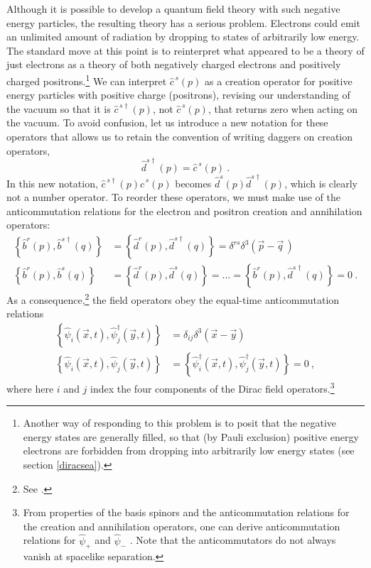 \documentclass[onecolumn,secnumarabic,amsmath,amssymb,balancelastpage,nofootinbib]{article}
\begin{document}
Although it is possible to develop a quantum field theory with such negative energy particles, the resulting theory has a serious problem.  Electrons could emit an unlimited amount of radiation by dropping to states of arbitrarily low energy.  The standard move at this point is to reinterpret what appeared to be a theory of just electrons as a theory of both negatively charged electrons and positively charged positrons.\footnote{Another way of responding to this problem is to posit that the negative energy states are generally filled, so that (by Pauli exclusion) positive energy electrons are forbidden from dropping into arbitrarily low energy states (see section \ref{diracsea}).}  We can interpret $\widehat{c}^{\,s}(p)$ as a creation operator for positive energy particles with positive charge (positrons), revising our understanding of the vacuum so that it is  $\widehat{c}^{\,s\dagger}(p)$, not $\widehat{c}^{\,s}(p)$, that returns zero when acting on the vacuum.  To avoid confusion, let us introduce a new notation for these operators that allows us to retain the convention of writing daggers on creation operators,
\begin{equation}
\widehat{d}^{s\dagger}(p)=\widehat{c}^{\,s}(p)
\ .
\label{operatorswap}
\end{equation}
In this new notation, $\widehat{c}^{\,s\dagger}(p)\widehat{c}^{\,s}(p)$ becomes $\widehat{d}^{s}(p)\widehat{d}^{s\dagger}(p)$, which is clearly not a number operator.  To reorder these operators, we must make use of the anticommutation relations for the electron and positron creation and annihilation operators:
\begin{align}
\left\{\widehat{b}^{r}(p),\widehat{b}^{s \dagger}(q)\right\}&=\left\{\widehat{d}^{r}(p),\widehat{d}^{s \dagger}(q)\right\}= \delta^{rs}\delta^3(\vec{p}-\vec{q}\,)
\nonumber
\\
\left\{\widehat{b}^{r}(p),\widehat{b}^{s}(q)\right\}&=\left\{\widehat{d}^{r}(p),\widehat{d}^{s}(q)\right\}=...=\left\{\widehat{b}^{r}(p),\widehat{d}^{s \dagger}(q)\right\}=0
\ .
\label{anticommutation}
\end{align}
As a consequence,\footnote{See \citet[pg.\ 140]{ryder}.} the field operators obey the equal-time anticommutation relations
\begin{align}
\left\{\widehat{\psi}_i(\vec{x},t),\widehat{\psi}^{\dagger}_j(\vec{y},t)\right\}&= \delta_{ij}\delta^3 (\vec{x}-\vec{y})
\nonumber
\\
\left\{\widehat{\psi}_i(\vec{x},t),\widehat{\psi}_j(\vec{y},t)\right\}&=
\left\{\widehat{\psi}^{\dagger}_i(\vec{x},t),\widehat{\psi}^{\dagger}_j(\vec{y},t)\right\}=0
\ ,
\label{fieldanticommutation}
\end{align}
where here $i$ and $j$ index the four components of the Dirac field operators.\footnote{From properties of the basis spinors and the anticommutation relations for the creation and annihilation operators, one can derive anticommutation relations for $\widehat{\psi}_+$ and $\widehat{\psi}_-$ \citep[sec.\ 8b]{schweberQFT}.  Note that the anticommutators do not always vanish at spacelike separation.\label{anticommutationfootnote}}
\end{document}
